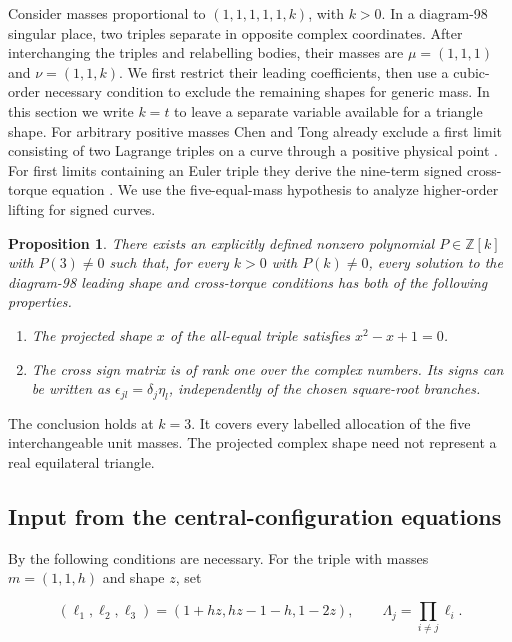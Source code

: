 \documentclass[11pt,letterpaper]{article}
\newtheorem{proposition}[theorem]{Proposition}
\theoremstyle{definition}
\begin{document}
Consider masses proportional to \( (1,1,1,1,1,k) \), with \(k>0\). In a diagram-98 singular place, two triples separate in opposite complex coordinates. After interchanging the triples and relabelling bodies, their masses are \(\mu=(1,1,1)\) and \(\nu=(1,1,k)\). We first restrict their leading coefficients, then use a cubic-order necessary condition to exclude the remaining shapes for generic mass. In this section we write $k=t$ to leave a separate variable available for a triangle shape. For arbitrary positive masses Chen and Tong already exclude a first limit consisting of two Lagrange triples on a curve through a positive physical point \cite[Prop.~5.21]{CT}. For first limits containing an Euler triple they derive the nine-term signed cross-torque equation \cite[eq.~(113)]{CT}. We use the five-equal-mass hypothesis to analyze higher-order lifting for signed curves.

\begin{proposition}\label{early:leading} There exists an explicitly defined nonzero polynomial \(P\in\mathbb Z[k]\) with \(P(3)\ne0\) such that, for every \(k>0\) with \(P(k)\ne0\), every solution to the diagram-98 leading shape and cross-torque conditions has both of the following properties.

\begin{enumerate}
\item The projected shape \(x\) of the all-equal triple satisfies \(x^2-x+1=0\).
\item The cross sign matrix is of rank one over the complex numbers. Its signs can be written as \(\epsilon_{jl}=\delta_j\eta_l\), independently of the chosen square-root branches.
\end{enumerate}

\end{proposition}

The conclusion holds at \(k=3\). It covers every labelled allocation of the five interchangeable unit masses. The projected complex shape need not represent a real equilateral triangle.

\subsection*{Input from the central-configuration equations}

By \cite[Lemmas~6.9 and 6.11, Thm.~6.12]{Tomar} the following conditions are necessary. For the triple with masses \(m=(1,1,h)\) and shape \(z\), set

\[
(\ell_1,\ell_2,\ell_3)=(1+hz,hz-1-h,1-2z),\qquad
\Lambda_j=\prod_{i\ne j}\ell_i.
\]
\end{document}
